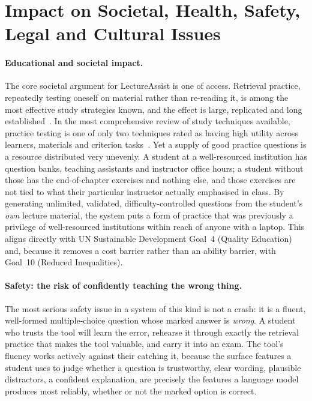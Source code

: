 \section{Impact on Societal, Health, Safety, Legal and Cultural Issues}
\label{sec:impacts-society}

\paragraph{Educational and societal impact.} The core societal argument for
LectureAssist is one of access. Retrieval practice, repeatedly testing oneself on
material rather than re-reading it, is among the most effective study strategies
known, and the effect is large, replicated and long
established~\cite{roediger2006testenhanced,karpicke2011retrieval}. In the most
comprehensive review of study techniques available, practice testing is one of only
two techniques rated as having high utility across learners, materials and
criterion tasks~\cite{dunlosky2013improving}. Yet a supply of good practice questions
is a resource distributed very unevenly. A student at a well-resourced institution
has question banks, teaching assistants and instructor office hours; a student
without those has the end-of-chapter exercises and nothing else, and those exercises
are not tied to what their particular instructor actually emphasised in class. By
generating unlimited, validated, difficulty-controlled questions from the student's
\emph{own} lecture material, the system puts a form of practice that was previously a
privilege of well-resourced institutions within reach of anyone with a laptop. This
aligns directly with UN Sustainable Development Goal~4 (Quality Education) and,
because it removes a cost barrier rather than an ability barrier, with Goal~10
(Reduced Inequalities).

\paragraph{Safety: the risk of confidently teaching the wrong thing.} The most
serious safety issue in a system of this kind is not a crash: it is a fluent,
well-formed multiple-choice question whose marked answer is \emph{wrong}. A student
who trusts the tool will learn the error, rehearse it through exactly the retrieval
practice that makes the tool valuable, and carry it into an exam. The tool's fluency
works actively against their catching it, because the surface features a student uses
to judge whether a question is trustworthy, clear wording, plausible distractors,
a confident explanation, are precisely the features a language model produces most
reliably, whether or not the marked option is correct.

